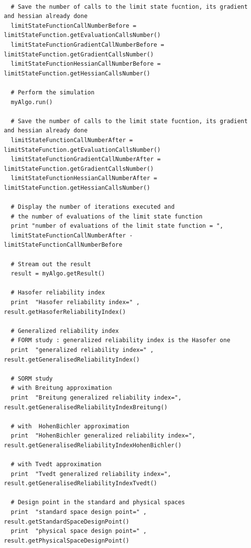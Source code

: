 \textspace\\



\begin{lstlisting}
  # Save the number of calls to the limit state fucntion, its gradient and hessian already done
  limitStateFunctionCallNumberBefore = limitStateFunction.getEvaluationCallsNumber()
  limitStateFunctionGradientCallNumberBefore = limitStateFunction.getGradientCallsNumber()
  limitStateFunctionHessianCallNumberBefore = limitStateFunction.getHessianCallsNumber()

  # Perform the simulation
  myAlgo.run()

  # Save the number of calls to the limit state fucntion, its gradient and hessian already done
  limitStateFunctionCallNumberAfter = limitStateFunction.getEvaluationCallsNumber()
  limitStateFunctionGradientCallNumberAfter = limitStateFunction.getGradientCallsNumber()
  limitStateFunctionHessianCallNumberAfter = limitStateFunction.getHessianCallsNumber()

  # Display the number of iterations executed and
  # the number of evaluations of the limit state function
  print "number of evaluations of the limit state function = ",
  limitStateFunctionCallNumberAfter - limitStateFunctionCallNumberBefore

  # Stream out the result
  result = myAlgo.getResult()

  # Hasofer reliability index
  print  "Hasofer reliability index=" , result.getHasoferReliabilityIndex()

  # Generalized reliability index
  # FORM study : generalized reliability index is the Hasofer one
  print  "generalized reliability index=" , result.getGeneralisedReliabilityIndex()

  # SORM study
  # with Breitung approximation
  print  "Breitung generalized reliability index=", result.getGeneralisedReliabilityIndexBreitung()

  # with  HohenBichler approximation
  print  "HohenBichler generalized reliability index=", result.getGeneralisedReliabilityIndexHohenBichler()

  # with Tvedt approximation
  print  "Tvedt generalized reliability index=", result.getGeneralisedReliabilityIndexTvedt()

  # Design point in the standard and physical spaces
  print  "standard space design point=" , result.getStandardSpaceDesignPoint()
  print  "physical space design point=" , result.getPhysicalSpaceDesignPoint()


\end{lstlisting}
